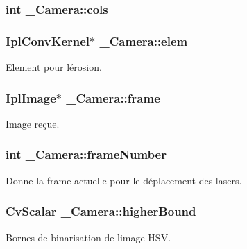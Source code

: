 \subsubsection[{\texorpdfstring{cols}{cols}}]{\setlength{\rightskip}{0pt plus 5cm}int \+\_\+\+Camera\+::cols}\hypertarget{struct___camera_a0bf89c266a3d53a2e1a016a61c931868}{}\label{struct___camera_a0bf89c266a3d53a2e1a016a61c931868}
\subsubsection[{\texorpdfstring{elem}{elem}}]{\setlength{\rightskip}{0pt plus 5cm}Ipl\+Conv\+Kernel$\ast$ \+\_\+\+Camera\+::elem}\hypertarget{struct___camera_a069a1733c9e85ccd40e15c392d0bb0bd}{}\label{struct___camera_a069a1733c9e85ccd40e15c392d0bb0bd}
Element pour l\textquotesingle{}érosion. 
\subsubsection[{\texorpdfstring{frame}{frame}}]{\setlength{\rightskip}{0pt plus 5cm}Ipl\+Image$\ast$ \+\_\+\+Camera\+::frame}\hypertarget{struct___camera_a012f5d979064f440339281889f57a640}{}\label{struct___camera_a012f5d979064f440339281889f57a640}
Image reçue. 
\subsubsection[{\texorpdfstring{frame\+Number}{frameNumber}}]{\setlength{\rightskip}{0pt plus 5cm}int \+\_\+\+Camera\+::frame\+Number}\hypertarget{struct___camera_ae7658cf59eeb1a655b1ac5a536cc7dd4}{}\label{struct___camera_ae7658cf59eeb1a655b1ac5a536cc7dd4}
Donne la frame actuelle pour le déplacement des lasers. 
\subsubsection[{\texorpdfstring{higher\+Bound}{higherBound}}]{\setlength{\rightskip}{0pt plus 5cm}Cv\+Scalar \+\_\+\+Camera\+::higher\+Bound}\hypertarget{struct___camera_aba192c658e63df9203ec78a99e892d27}{}\label{struct___camera_aba192c658e63df9203ec78a99e892d27}
Bornes de binarisation de l\textquotesingle{}image H\+SV. 
